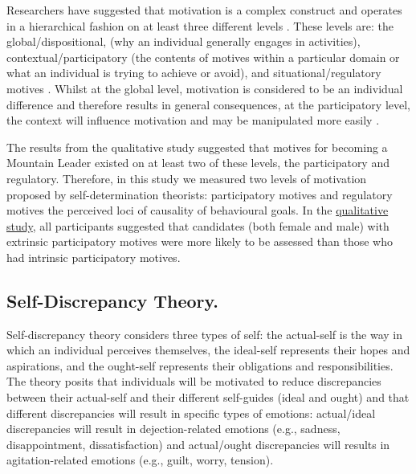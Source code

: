 \documentclass[
  12pt,
  a4paper,
]{book}
\begin{document}
Researchers have suggested that motivation is a complex construct and operates in a hierarchical fashion on at least three different levels \citep{Ingledew2009, Vallerand1997, Vallerand2002}. These levels are: the global/dispositional, (why an individual generally engages in activities), contextual/participatory (the contents of motives within a particular domain or what an individual is trying to achieve or avoid), and situational/regulatory motives \citep[the perceived locus of causality of the behavioural goals---where the motive sits on the relative autonomy continuum;][]{Deci2000, Ingledew2009, Vallerand1997, Vallerand2002}. Whilst at the global level, motivation is considered to be an individual difference and therefore results in general consequences, at the participatory level, the context will influence motivation and may be manipulated more easily \citep{Vallerand2002}.

The results from the qualitative study suggested that motives for becoming a Mountain Leader existed on at least two of these levels, the participatory and regulatory. Therefore, in this study we measured two levels of motivation proposed by self-determination theorists: participatory motives and regulatory motives the perceived loci of causality of behavioural goals. In the \protect\hyperlink{qual-part-motives}{qualitative study}, all participants suggested that candidates (both female and male) with extrinsic participatory motives were more likely to be assessed than those who had intrinsic participatory motives.

\hypertarget{self-discrepancy-theory.}{%
\subsection{Self-Discrepancy Theory.}\label{self-discrepancy-theory.}}

Self-discrepancy theory \citep{Higgins1987} considers three types of self: the actual-self is the way in which an individual perceives themselves, the ideal-self represents their hopes and aspirations, and the ought-self represents their obligations and responsibilities. The theory posits that individuals will be motivated to reduce discrepancies between their actual-self and their different self-guides (ideal and ought) and that different discrepancies will result in specific types of emotions: actual/ideal discrepancies will result in dejection-related emotions (e.g., sadness, disappointment, dissatisfaction) and actual/ought discrepancies will results in agitation-related emotions (e.g., guilt, worry, tension).
\end{document}

